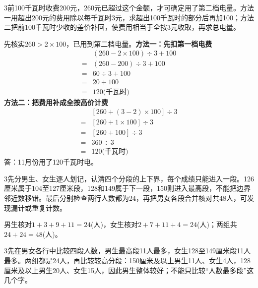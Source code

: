\documentclass[multi=snippet,border={5bp 20bp 5bp 5bp}]{standalone}
\newenvironment{snippet}[3]{\begin{minipage}{#1bp}\color{answerred}\fontsize{#2}{#3}\selectfont\raggedright}{\end{minipage}}
\begin{document}
\begin{snippet}{505}{11.5}{14}\begin{multicols}{3}\raggedcolumns 前100千瓦时收费200元，260元已超过这个金额，才可确定用了第二档电量。方法一用超出200元的费用除以每千瓦时3元，求超出100千瓦时的部分后再加100；方法二把前100千瓦时少收的差价补回，使费用相当于全按3元收取，再求总电量。\par 先核实\(260>2\times100\)\allowbreak ，已用到第二档电量。\textbf{方法一：先扣第一档电费}\[\begin{aligned} &(260-2\times100)\div3+100\\={}&(260-200)\div3+100\\={}&60\div3+100\\={}&20+100\\={}&120\text{(千瓦时)}\end{aligned}\]\textbf{方法二：把费用补成全按高价计费}\[\begin{aligned} &[260+(3-2)\times100]\div3\\={}&[260+1\times100]\div3\\={}&[260+100]\div3\\={}&360\div3\\={}&120\text{(千瓦时)}\end{aligned}\]答：11月份用了120千瓦时电。\end{multicols}\end{snippet}
\begin{snippet}{505}{11.5}{14}\begin{multicols}{3}\raggedcolumns 先分男生、女生逐人划记，认清四个分段的上下界，每个成绩只能进入一段。126厘米属于104至127厘米段，128和149属于下一段，150则进入最高段，不能把边界邻近数移错。最后分别检查两行人数都为24，再把男女各段合并核对共48人，可发现漏计或重复计数。\par 男生核对\(1+3+9+11=24\)\allowbreak (人)，女生核对\(2+7+11+4=24\)\allowbreak (人)；两组共\(24+24=48\)\allowbreak (人)。\end{multicols}\end{snippet}
\begin{snippet}{505}{11.5}{14}\begin{multicols}{3}\raggedcolumns 先在男女各行中比较四段人数，男生最高段11人最多，女生128至149厘米段11人最多。两组都是24人，再比较较高分段：150厘米及以上男生11人、女生4人，128厘米及以上男生20人、女生15人，因此男生整体较好；不能只比较“人数最多段”这几个字。\end{multicols}\end{snippet}
\end{document}
